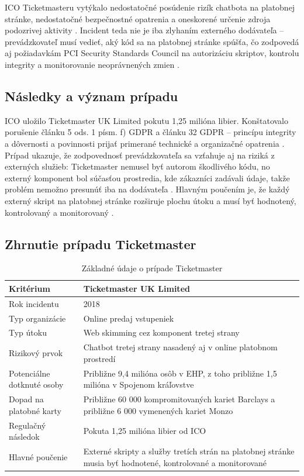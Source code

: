 ICO Ticketmasteru vytýkalo nedostatočné posúdenie rizík chatbota na platobnej stránke, nedostatočné bezpečnostné opatrenia a oneskorené určenie zdroja podozrivej aktivity \cite{ico2020Ticketmaster}. Incident teda nie je iba zlyhaním externého dodávateľa -- prevádzkovateľ musí vedieť, aký kód sa na platobnej stránke spúšťa, čo zodpovedá aj požiadavkám PCI Security Standards Council na autorizáciu skriptov, kontrolu integrity a monitorovanie neoprávnených zmien \cite{pciSsc2025PaymentPage}.

\subsection{Následky a význam prípadu}

ICO uložilo Ticketmaster UK Limited pokutu 1,25 milióna libier. Konštatovalo porušenie článku 5 ods. 1 písm. f) GDPR a článku 32 GDPR -- princípu integrity a dôvernosti a povinnosti prijať primerané technické a organizačné opatrenia \cite{ico2020Ticketmaster}. Prípad ukazuje, že zodpovednosť prevádzkovateľa sa vzťahuje aj na riziká z externých služieb: Ticketmaster nemusel byť autorom škodlivého kódu, no externý komponent bol súčasťou prostredia, kde zákazníci zadávali údaje, takže problém nemožno presunúť iba na dodávateľa \cite{pciSsc2025PaymentPage}. Hlavným poučením je, že každý externý skript na platobnej stránke rozširuje plochu útoku a musí byť hodnotený, kontrolovaný a monitorovaný \cite{owaspThirdPartyJavascript}.

\subsection{Zhrnutie prípadu Ticketmaster}

\begin{table}[htbp]
    \centering
    \caption{Základné údaje o prípade Ticketmaster}
    \label{tab:ticketmaster-summary}
    \begin{tabularx}{\textwidth}{@{}p{}X@{}}
        \toprule
        \textbf{Kritérium} & \textbf{Ticketmaster UK Limited} \\
        \midrule
        Rok incidentu & 2018 \\
        Typ organizácie & Online predaj vstupeniek \\
        Typ útoku & Web skimming cez komponent tretej strany \\
        Rizikový prvok & Chatbot tretej strany nasadený aj v online platobnom prostredí \\
        Potenciálne dotknuté osoby & Približne 9,4 milióna osôb v EHP, z toho približne 1,5 milióna v Spojenom kráľovstve \\
        Dopad na platobné karty & Približne 60 000 kompromitovaných kariet Barclays a približne 6 000 vymenených kariet Monzo \\
        Regulačný následok & Pokuta 1,25 milióna libier od ICO \\
        Hlavné poučenie & Externé skripty a služby tretích strán na platobnej stránke musia byť hodnotené, kontrolované a monitorované \\
        \bottomrule
    \end{tabularx}
\end{table}
